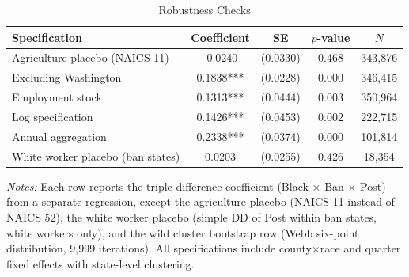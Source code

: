 \begin{table}[htbp]
\centering
\caption{Robustness Checks}
\label{tab:robustness}
\begin{tabular}{lcccc}
\toprule
Specification & Coefficient & SE & $p$-value & $N$ \\
\midrule
Agriculture placebo (NAICS 11) & -0.0240 & (0.0330) & 0.468 & 343,876 \\
Excluding Washington & 0.1838*** & (0.0228) & 0.000 & 346,415 \\
Employment stock & 0.1313*** & (0.0444) & 0.003 & 350,964 \\
Log specification & 0.1426*** & (0.0453) & 0.002 & 222,715 \\
Annual aggregation & 0.2338*** & (0.0374) & 0.000 & 101,814 \\
\addlinespace
White worker placebo (ban states) & 0.0203 & (0.0255) & 0.426 & 18,354 \\
\bottomrule
\end{tabular}
\begin{tablenotes}
\small
\item \textit{Notes:} Each row reports the triple-difference coefficient (Black $\times$ Ban $\times$ Post) from a separate regression, except the agriculture placebo (NAICS 11 instead of NAICS 52), the white worker placebo (simple DD of Post within ban states, white workers only), and the wild cluster bootstrap row (Webb six-point distribution, 9,999 iterations). All specifications include county$\times$race and quarter fixed effects with state-level clustering.
\end{tablenotes}
\end{table}
